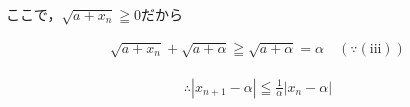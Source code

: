 \documentclass[autodetect-engine,ja=standard, 10.5pt, a4paper, titlepage]{bxjsarticle}
\begin{document}
\begin{enumerate}[1.]
    ここで，$\sqrt{a + x_n}\geqq 0$だから
      \begin{fleqn}[20pt]
        \begin{align*}
          \sqrt{a + x_n} + \sqrt{a + \alpha} \geqq \sqrt{a + \alpha} = \alpha\quad(\because \mathrm{(iii)})
        \end{align*}
      \end{fleqn}
      \begin{fleqn}[20pt]
        \begin{align*}
          \therefore |x_{n+1} - \alpha|\leqq \frac{1}{\alpha}|x_n - \alpha|
        \end{align*}
      \end{fleqn}



\end{enumerate}
\end{document}
